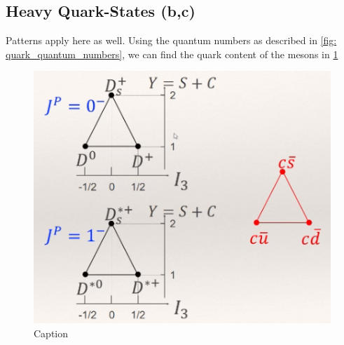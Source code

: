 \subsection{Heavy Quark-States (b,c)}
Patterns apply here as well. Using the quantum numbers as described in \cref{fig: quark_quantum_numbers}, we can find the quark content of the mesons in \cref{fig: heavy_baryon_nonets}

\begin{figure}[h!]
\centering
\includegraphics[width = .75\textwidth]{heavy_baryon_nonets.png}
\caption{Caption}
\label{fig: heavy_baryon_nonets}
\end{figure}


